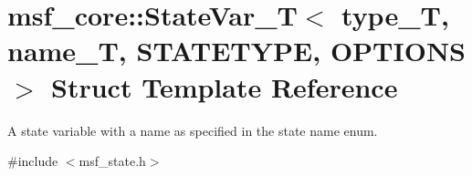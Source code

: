 \hypertarget{structmsf__core_1_1StateVar__T}{\section{msf\-\_\-core\-:\-:State\-Var\-\_\-\-T$<$ type\-\_\-\-T, name\-\_\-\-T, S\-T\-A\-T\-E\-T\-Y\-P\-E, O\-P\-T\-I\-O\-N\-S $>$ Struct Template Reference}
\label{structmsf__core_1_1StateVar__T}
}


A state variable with a name as specified in the state name enum.  




{\ttfamily \#include $<$msf\-\_\-state.\-h$>$}

